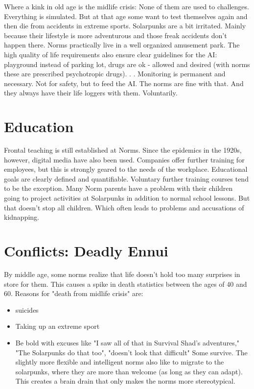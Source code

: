 Where a kink in old age is the midlife crisis:
None of them are used to challenges. Everything is simulated. But at that age some want to test themselves again and then die from accidents in extreme sports. Solarpunks are a bit irritated. Mainly because their lifestyle is more adventurous and those freak accidents don't happen there.
Norms practically live in a well organized amusement park. The high quality of life requirements also ensure clear guidelines for the AI: playground instead of parking lot, drugs are ok - allowed and desired (with norms these are prescribed psychotropic drugs). . . Monitoring is permanent and
necessary. Not for safety, but to feed the AI. The norms are fine with that. And they always have their life loggers with them. Voluntarily.


\section{Education}
Frontal teaching is still established at Norms. Since the epidemics in the 1920s, however, digital media have also been used. Companies offer further training for employees, but this is strongly geared to the needs of the workplace.
Educational goals are clearly defined and quantifiable. Voluntary further training courses tend to be the exception. Many Norm parents have a problem with their children going to project activities at Solarpunks in addition to normal school lessons. But that doesn't stop all children. Which often leads to problems and accusations of kidnapping.

\section{Conflicts: Deadly Ennui}
By middle age, some norms realize that life doesn't hold too many surprises in store for them.
This causes a spike in death statistics between the ages of 40 and 60. Reasons for "death from midlife crisis" are:
\begin{itemize}
    \item suicides
    \item Taking up an extreme sport
    \item Be bold with excuses like "I saw all of that in Survival Shad's adventures," "The Solarpunks do that too", "doesn't look that difficult" Some survive. The slightly more flexible and intelligent norms also like to migrate to the solarpunks, where they are more than welcome (as long as they can adapt). This creates a brain drain that only makes the norms more stereotypical.
\end{itemize}

